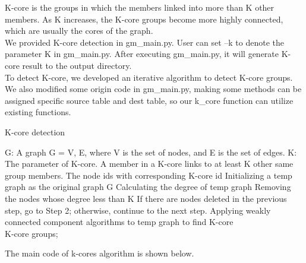
K-core is the groups in which the members linked into more than K other members. As K increases, the K-core groups become more highly connected, which are usually the cores of the graph. 
\\
We provided K-core detection in gm\_main.py. User can set --k to denote the parameter K in gm\_main.py. After executing gm\_main.py, it will generate K-core result to the output directory.
\\
To detect K-core, we developed an iterative algorithm to detect K-core groups. We also modified some origin code in gm\_main.py, making some methods can be assigned specific source table and dest table, so our k\_core function can utilize existing functions. 

\begin{algorithm}[htb]
  \caption{ K-core detection}
  \label{alg:Framwork}
  \begin{algorithmic}[1]
    \Require G: A graph G = {V, E}, where V is the set of nodes, and E is the set of edges. K: The parameter of K-core. A member in a K-core links to at least K other same group members. 
    \Ensure The node ids with corresponding K-core id
    \State Initializing a temp graph as the original graph G
    \State Calculating the degree of temp graph 
    \State Removing the nodes whose degree less than K
    \State If there are nodes deleted in the previous step, go to Step 2; otherwise, continue to the next step.
    \State Applying weakly connected component algorithms to temp graph to find K-core
    \\
    \Return K-core groups;
  \end{algorithmic}
\end{algorithm}

\clearpage

The main code of k-cores algorithm is shown below.

